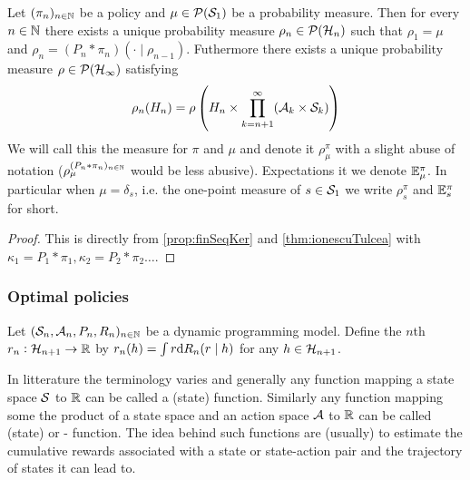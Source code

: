 \documentclass{article}
\begin{document}
\begin{prop}
  Let $(\pi_n)_{n \in \mathbb{N}}$ be a policy and 
  $\mu \in \mathcal{P}(\mathcal{S}_1)$ be a probability measure.
  Then for every $n \in \mathbb{N}$ there exists a unique probability measure
  $\rho_n \in \mathcal{P}(\mathcal{H}_n)$
  such that $\rho_1 = \mu$ and
  $\rho_n = (P_n * \pi_n)(\cdot \mid \rho_{n-1})$.
  Futhermore there exists a unique probability measure
  $\rho \in \mathcal{P}(\mathcal{H}_\infty)$ satisfying
  \[ \rho_n(H_n) = \rho \left( H_n \times
  \prod_{k=n+1}^\infty (\mathcal{A}_k \times \mathcal{S}_k) \right) \]
  We will call this the  measure for $\pi$ and $\mu$
  and denote it $\rho_{\mu}^\pi$ with a slight abuse of notation
  ($\rho_\mu^{(P_n * \pi_n)_{n \in \mathbb{N}}}$ would be less abusive).
  Expectations it we denote $\mathbb{E}_\mu^\pi$.
  In particular when $\mu = \delta_s$, i.e. the one-point measure of
  $s \in \mathcal{S}_1$ we write $\rho_s^\pi$ and $\mathbb{E}_s^\pi$ for short.
  \label{prop:polProc}
\end{prop}
\begin{proof}
  This is directly from \cref{prop:finSeqKer} and 
  \cref{thm:ionescuTulcea} with
  $\kappa_1 = P_1 * \pi_1, \kappa_2 = P_2 * \pi_2 \dots$.
\end{proof}


\subsubsection{Optimal policies}

Let $(\mathcal{S}_n, \mathcal{A}_n, P_n, R_n)_{n \in \mathbb{N}}$ be a dynamic programming model.
Define the $n$th 
$r_n : \mathcal{H}_{n+1} \to \mathbb{R}$ by
$r_n(h) = \int r \mathrm{d} R_n(r \mid h)$ for any $h \in
\mathcal{H}_{n+1}$.


In litterature the terminology varies and generally %
any function mapping a state space $\mathcal{S}$ to $\mathbb{R}$
can be called a (state)
 function. Similarly any function mapping some the
product of a state space and an
action space $\mathcal{A}$ to $\mathbb{R}$ can be called (state)
 or - function.
The idea behind such functions are (usually) to estimate the
cumulative rewards associated with a state or state-action pair
and the trajectory of states it can lead to.
\end{document}
